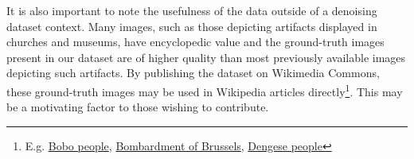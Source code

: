 It is also important to note the usefulness of the data outside of a denoising dataset context. Many images, such as those depicting artifacts displayed in churches and museums, have encyclopedic value and the ground-truth images present in our dataset are of higher quality than most previously available images depicting such artifacts. By publishing the dataset on Wikimedia Commons, these ground-truth images may be used in Wikipedia articles directly\footnote{E.g. \href{https://en.wikipedia.org/wiki/Bobo_people}{Bobo people}, \href{https://en.wikipedia.org/wiki/Bombardment_of_Brussels}{Bombardment of Brussels}, \href{https://en.wikipedia.org/wiki/Dengese_people}{Dengese people}}. This may be a motivating factor to those wishing to contribute.
